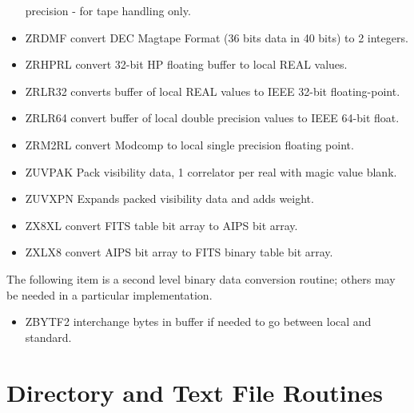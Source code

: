 \begin{itemize}
precision - for tape handling only.
\item ZRDMF     convert DEC Magtape Format (36 bits data
in 40 bits) to 2 integers.
\item ZRHPRL    convert 32-bit HP floating buffer to
local REAL values.
\item ZRLR32    converts buffer of local REAL values to
IEEE 32-bit floating-point.
\item ZRLR64    convert buffer of local double precision
values to IEEE 64-bit float.
\item ZRM2RL    convert Modcomp to local single
precision floating point.
\item ZUVPAK    Pack visibility data, 1 correlator per
real with magic value blank.
\item ZUVXPN    Expands packed visibility data and adds
weight.
\item ZX8XL     convert FITS table bit array to AIPS bit
array.
\item ZXLX8     convert AIPS bit array to FITS binary
table bit array.
\end{itemize} %

The following item is a second level binary data conversion routine;
others may be needed in a particular implementation.
\begin{itemize} %
\item ZBYTF2    interchange bytes in buffer if needed to
go between local and standard.
\end{itemize} %

\section{Directory and Text File Routines }

